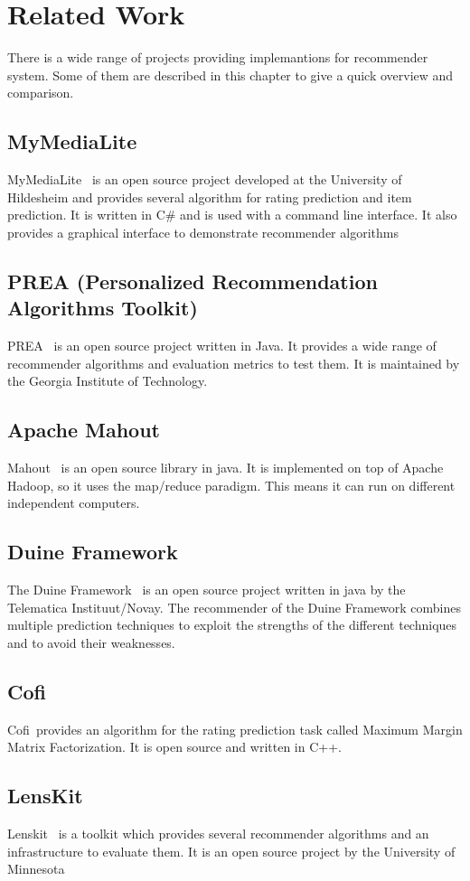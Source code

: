 
\chapter{Related Work}

There is a wide range of projects providing implemantions for recommender
system. Some of them are described in this chapter to give a quick
overview and comparison.


\section{MyMediaLite}

MyMediaLite~\cite{Gantner2011MyMediaLite} is an open source project developed at the
University of Hildesheim and provides several algorithm for rating
prediction and item prediction. It is written in C\# and is used with
a command line interface. It also provides a graphical interface to
demonstrate recommender algorithms


\section{PREA (Personalized Recommendation Algorithms Toolkit)}

PREA~\cite{2012arXiv1205.3193L} is an open source project written in Java. It provides
a wide range of recommender algorithms and evaluation metrics to test
them. It is maintained by the Georgia Institute of Technology.


\section{Apache Mahout}

Mahout~\cite{mahout} is an open source library in java. It is implemented
on top of Apache Hadoop, so it uses the map/reduce paradigm. This
means it can run on different independent computers.


\section{Duine Framework}

The Duine Framework~\cite{duine} is an open source project written
in java by the Telematica Instituut/Novay. The recommender of the
Duine Framework combines multiple prediction techniques to exploit
the strengths of the different techniques and to avoid their weaknesses.


\section{Cofi}

Cofi~\cite{cofi}provides an algorithm for the rating prediction
task called Maximum Margin Matrix Factorization. It is open source
and written in C++.


\section{LensKit}

Lenskit~\cite{Ekstrand:2011:RRR:2043932.2043958} is a toolkit which provides several recommender
algorithms and an infrastructure to evaluate them. It is an open source
project by the University of Minnesota
